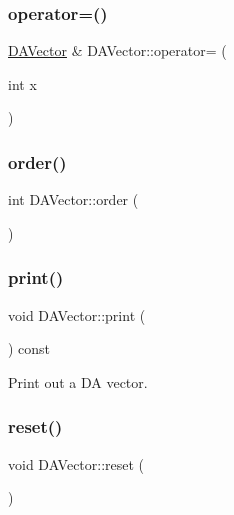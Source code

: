 \subsubsection{\texorpdfstring{operator=()}{operator=()}\hspace{0.1cm}{\footnotesize\ttfamily [4/4]}}
{\footnotesize\ttfamily \mbox{\hyperlink{struct_d_a_vector}{D\+A\+Vector}} \& D\+A\+Vector\+::operator= (\begin{DoxyParamCaption}\item[{int}]{x }\end{DoxyParamCaption})}

\mbox{\label{struct_d_a_vector_a442d4b491a94164eb52936143b332345}} 
\subsubsection{\texorpdfstring{order()}{order()}}
{\footnotesize\ttfamily int D\+A\+Vector\+::order (\begin{DoxyParamCaption}{ }\end{DoxyParamCaption})\hspace{0.3cm}{\ttfamily [static]}}

\mbox{\label{struct_d_a_vector_a6d5253e4312ca9ca5e68859f706f9f2c}} 
\subsubsection{\texorpdfstring{print()}{print()}}
{\footnotesize\ttfamily void D\+A\+Vector\+::print (\begin{DoxyParamCaption}{ }\end{DoxyParamCaption}) const}

Print out a DA vector. \mbox{\label{struct_d_a_vector_a0c85003e3b334ca94135b4874c36f7e3}} 
\subsubsection{\texorpdfstring{reset()}{reset()}}
{\footnotesize\ttfamily void D\+A\+Vector\+::reset (\begin{DoxyParamCaption}{ }\end{DoxyParamCaption})}

